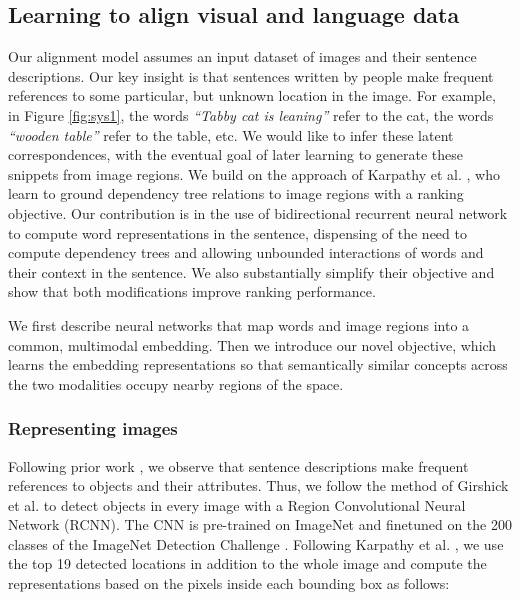 \documentclass[10pt,twocolumn,letterpaper]{article}
\begin{document}
\vspace{-0.1in}
\subsection{Learning to align visual and language data}
\label{sec:align}
\vspace{-0.15in}

Our alignment model assumes an input dataset of images and their sentence descriptions. Our key insight is that sentences written by people make frequent references to some particular, but unknown location in the image. For example, in Figure \ref{fig:sys1}, the words \textit{``Tabby cat is leaning''} refer to the cat, the words \textit{``wooden table''} refer to the table, etc. We would like to infer these latent correspondences, with the eventual goal of later learning to generate these snippets from image regions. We build on the approach of Karpathy et al. \cite{defrag}, who learn to ground dependency tree relations to image regions with a ranking objective. Our contribution is in the use of bidirectional recurrent neural network to compute word representations in the sentence, dispensing of the need to compute dependency trees and allowing unbounded interactions of words and their context in the sentence. We also substantially simplify their objective and show that both modifications improve ranking performance.

We first describe neural networks that map words and image regions into a common, multimodal embedding. Then we introduce our novel objective, which learns the embedding representations so that semantically similar concepts across the two modalities occupy nearby regions of the space.

\vspace{-0.15in}
\subsubsection{Representing images}
\vspace{-0.15in}

Following prior work \cite{kulkarni2011baby,defrag}, we observe that sentence descriptions make frequent references to objects and their attributes. Thus, we follow the method of Girshick et al. \cite{girshick2014rcnn} to detect objects in every image with a Region Convolutional Neural Network (RCNN). The CNN is pre-trained on ImageNet \cite{deng2009imagenet} and finetuned on the 200 classes of the ImageNet Detection Challenge \cite{ilsvrc}. Following Karpathy et al. \cite{defrag}, we use the top 19 detected locations in addition to the whole image and compute the representations based on the pixels  inside each bounding box as follows:
\end{document}
